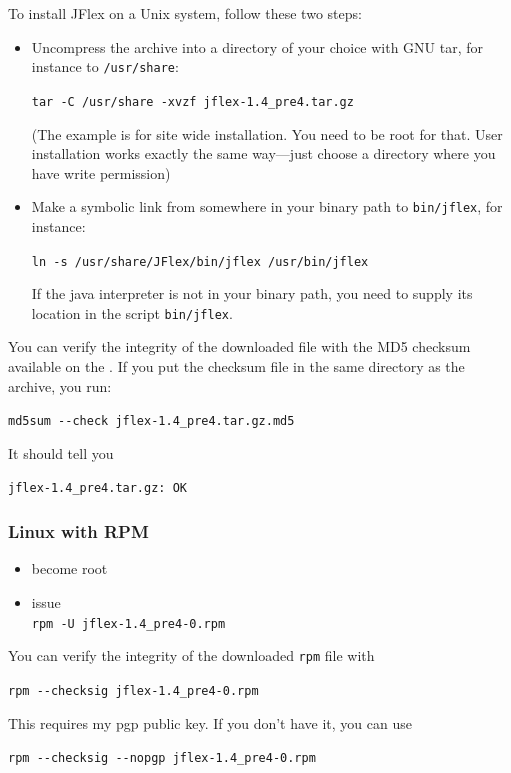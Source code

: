 \documentclass[11pt]{scrartcl}
\newcommand{\ver}{1.4\_pre4}
\begin{document}
To install JFlex on a Unix system, follow these two steps:
\begin{itemize}
\item
  Uncompress the archive into a directory of your choice
  with GNU tar, for instance to \texttt{/usr/share}:

  \texttt{tar -C /usr/share -xvzf jflex-\ver.tar.gz}
  
  (The example is for site wide installation. You need to
  be root for that. User installation works exactly the
  same way---just choose a directory where you have write
  permission)

\item
  Make a symbolic link from somewhere in your binary 
  path to \texttt{bin/jflex}, for instance:

  \texttt{ln -s /usr/share/JFlex/bin/jflex /usr/bin/jflex}

  If the java interpreter is not in your binary path, you
  need to supply its location in the script \texttt{bin/jflex}.
\end{itemize}

You can verify the integrity of the downloaded file with
the MD5 checksum available on the . 
If you put the checksum file in the same directory
as the archive, you run:

\verb+md5sum --check +\texttt{jflex-\ver.tar.gz.md5}

It should tell you

\texttt{jflex-\ver.tar.gz: OK}

\subsubsection{Linux with RPM}

\begin{itemize}
\item
  become root
\item issue\\
  \texttt{rpm -U jflex-\ver-0.rpm}
\end{itemize}

You can verify the integrity of the downloaded \texttt{rpm} file with

\verb+rpm --checksig +\texttt{jflex-\ver-0.rpm}

This requires my pgp public key. If you don't have it, you can use

\verb+rpm --checksig --nopgp +\texttt{jflex-\ver-0.rpm}
\end{document}

